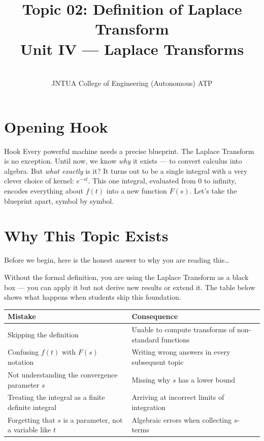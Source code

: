 \documentclass[12pt,a4paper]{article}
\title{Topic 02: Definition of Laplace Transform \\
       \large Unit IV --- Laplace Transforms}
\author{ \\
        JNTUA College of Engineering (Autonomous) ATP}
\date{}
\begin{document}
\maketitle
\tableofcontents
\newpage

\section{Opening Hook}
\begin{curiositybox}{Hook}
Every powerful machine needs a precise blueprint. The Laplace Transform is no
exception. Until now, we know \emph{why} it exists --- to convert calculus into
algebra. But \emph{what exactly} is it? It turns out to be a single integral
with a very clever choice of kernel: $e^{-st}$. This one integral, evaluated
from 0 to infinity, encodes everything about $f(t)$ into a new function $F(s)$.
Let's take the blueprint apart, symbol by symbol.
\end{curiositybox}

\section{Why This Topic Exists}

Before we begin, here is the honest answer to why you are reading this\ldots

Without the formal definition, you are using the Laplace Transform as a black
box --- you can apply it but not derive new results or extend it. The table
below shows what happens when students skip this foundation.

\medskip
\begin{center}
\begin{tabular}{@{}p{7cm} p{7cm}@{}}
\toprule
\textbf{Mistake} & \textbf{Consequence} \\
\midrule
Skipping the definition
  & Unable to compute transforms of non-standard functions \\[4pt]
Confusing $f(t)$ with $F(s)$ notation
  & Writing wrong answers in every subsequent topic \\[4pt]
Not understanding the convergence parameter $s$
  & Missing why $s$ has a lower bound \\[4pt]
Treating the integral as a finite definite integral
  & Arriving at incorrect limits of integration \\[4pt]
Forgetting that $s$ is a parameter, not a variable like $t$
  & Algebraic errors when collecting $s$-terms \\
\bottomrule
\end{tabular}
\end{center}
\medskip
\end{document}
